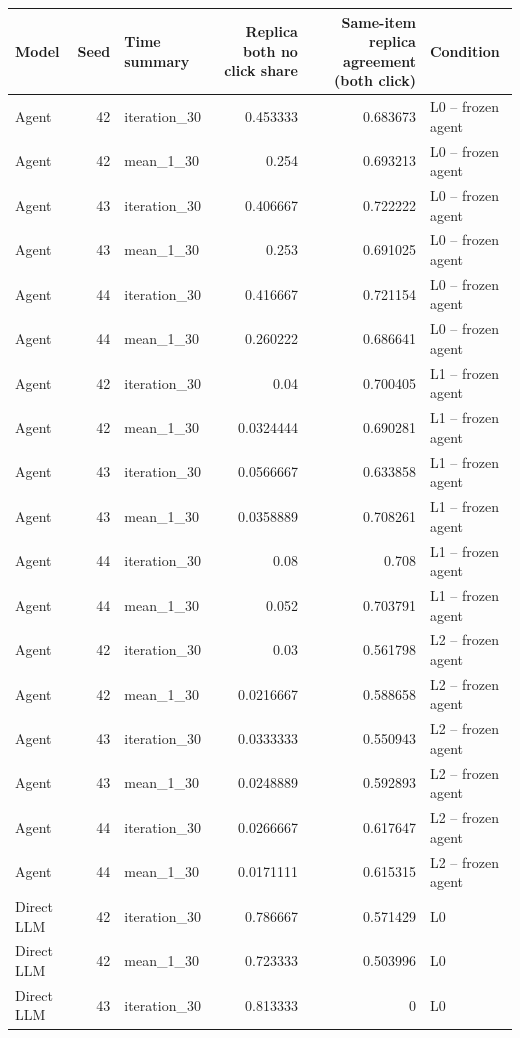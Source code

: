 \begin{table}[htbp!]
\centering
\small
\setlength{\tabcolsep}{3pt}
\renewcommand{\arraystretch}{1.1}
\begin{tabular}{lrlrrl}
\hline
Model & Seed & Time summary & Replica both no click share & Same-item replica agreement (both click) & Condition \\
\hline
Agent & 42 & iteration\_30 & 0.453333 & 0.683673 & L0 -- frozen agent \\
Agent & 42 & mean\_1\_30 & 0.254 & 0.693213 & L0 -- frozen agent \\
Agent & 43 & iteration\_30 & 0.406667 & 0.722222 & L0 -- frozen agent \\
Agent & 43 & mean\_1\_30 & 0.253 & 0.691025 & L0 -- frozen agent \\
Agent & 44 & iteration\_30 & 0.416667 & 0.721154 & L0 -- frozen agent \\
Agent & 44 & mean\_1\_30 & 0.260222 & 0.686641 & L0 -- frozen agent \\
Agent & 42 & iteration\_30 & 0.04 & 0.700405 & L1 -- frozen agent \\
Agent & 42 & mean\_1\_30 & 0.0324444 & 0.690281 & L1 -- frozen agent \\
Agent & 43 & iteration\_30 & 0.0566667 & 0.633858 & L1 -- frozen agent \\
Agent & 43 & mean\_1\_30 & 0.0358889 & 0.708261 & L1 -- frozen agent \\
Agent & 44 & iteration\_30 & 0.08 & 0.708 & L1 -- frozen agent \\
Agent & 44 & mean\_1\_30 & 0.052 & 0.703791 & L1 -- frozen agent \\
Agent & 42 & iteration\_30 & 0.03 & 0.561798 & L2 -- frozen agent \\
Agent & 42 & mean\_1\_30 & 0.0216667 & 0.588658 & L2 -- frozen agent \\
Agent & 43 & iteration\_30 & 0.0333333 & 0.550943 & L2 -- frozen agent \\
Agent & 43 & mean\_1\_30 & 0.0248889 & 0.592893 & L2 -- frozen agent \\
Agent & 44 & iteration\_30 & 0.0266667 & 0.617647 & L2 -- frozen agent \\
Agent & 44 & mean\_1\_30 & 0.0171111 & 0.615315 & L2 -- frozen agent \\
Direct LLM & 42 & iteration\_30 & 0.786667 & 0.571429 & L0 \\
Direct LLM & 42 & mean\_1\_30 & 0.723333 & 0.503996 & L0 \\
Direct LLM & 43 & iteration\_30 & 0.813333 & 0 & L0 \\

\end{tabular}
\end{table}
